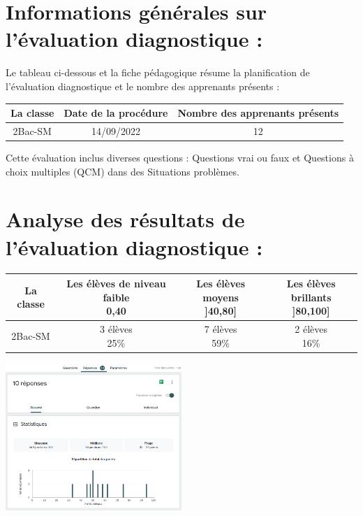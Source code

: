 \documentclass[12pt]{article}
\begin{document}
\section{Informations générales sur l’évaluation diagnostique :  }
Le tableau ci-dessous et la fiche pédagogique résume la planification de l’évaluation diagnostique et le nombre des apprenants présents :
\begin{center}
  \begin{tabular}{|c|c|c|}
	  \hline
	  La classe & Date de la procédure & Nombre des apprenants présents\\\hline
	  2Bac-SM & 14/09/2022 & 12\\\hline
\end{tabular}
\end{center}

Cette évaluation inclus diverses questions : Questions vrai ou faux et Questions à choix multiples (QCM) dans des Situations problèmes.
\section{Analyse des résultats de l’évaluation diagnostique : }

\begin{center}
  \begin{tabular}{|c|c|c|c|}
	  \hline
La classe & \makecell{Les élèves de niveau faible \\ 0,40} & \makecell{Les élèves moyens \\ ]40,80]}& \makecell{Les élèves brillants \\  ]80,100]} \\\hline
2Bac-SM & \makecell{3 élèves \\ 25\%} & \makecell{7 élèves \\ 59\%}& \makecell{2 élèves \\ 16\%} \\\hline
\end{tabular}
\end{center}

\begin{center}
	\includegraphics[width=0.5\textwidth]{./img/test-online.png}
\end{center}
\end{document}
